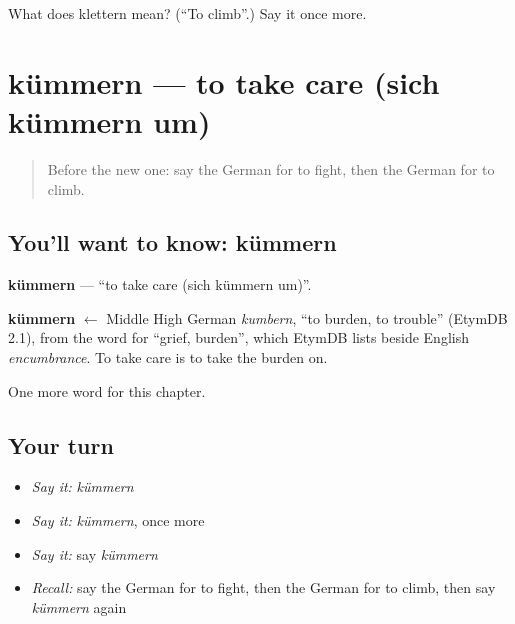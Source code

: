 \begin{tcolorbox}[breakable,colback=teal!4,colframe=teal!35!black,title={Before you move on}]
What does klettern mean? (\textquotedblleft{}To climb\textquotedblright{}.) Say it once more.
\end{tcolorbox}
\section[kümmern]{kümmern — to take care (sich kümmern um)}

\label{lesson:GE-C182-kuemmern}



\begin{quote}
Before the new one: say the German for to fight, then the German for to climb.
\end{quote}

\subsection*{You'll want to know: kümmern}
\textbf{kümmern} — \textquotedblleft{}to take care (sich kümmern um)\textquotedblright{}.

\begin{cousinweb}
\textbf{kümmern} $\leftarrow$ Middle High German \emph{kumbern}, \textquotedblleft{}to burden, to trouble\textquotedblright{} (EtymDB 2.1), from the word for \textquotedblleft{}grief, burden\textquotedblright{}, which EtymDB lists beside English \emph{encumbrance}. To take care is to take the burden on.
\end{cousinweb}

\begin{grammarlens}[title={What you've built}]
One more word for this chapter.
\end{grammarlens}

\subsection*{Your turn}
\begin{itemize}
\raggedright
  \item \emph{Say it:} \emph{kümmern}
  \item \emph{Say it:} \emph{kümmern}, once more
  \item \emph{Say it:} say \emph{kümmern}
  \item \emph{Recall:} say the German for to fight, then the German for to climb, then say \emph{kümmern} again
\end{itemize}

